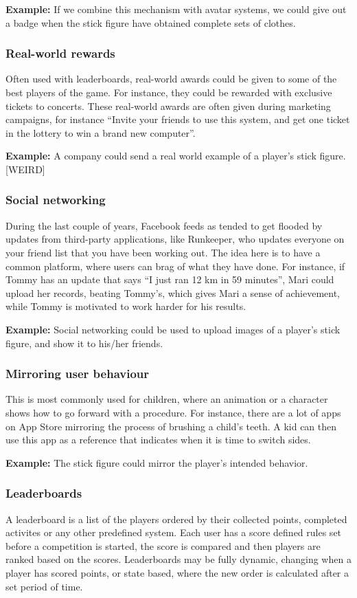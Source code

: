 \textbf{Example:} If we combine this mechanism with avatar systems, we could give out a badge when the stick figure have obtained complete sets of clothes.   

\subsubsection{Real-world rewards}
Often used with leaderboards, real-world awards could be given to some of the best players of the game. For instance, they could be rewarded with exclusive tickets to concerts. These real-world awards are often given during marketing campaigns, for instance ``Invite your friends to use this system, and get one ticket in the lottery to win a brand new computer''.  

\textbf{Example:} A company could send a real world example of a player's stick figure. [WEIRD]

\subsubsection{Social networking}
During the last couple of years, Facebook feeds as tended to get flooded by updates from third-party applications, like Runkeeper, who updates everyone on your friend list that you have been working out. The idea here is to have a common platform, where users can brag of what they have done. For instance, if Tommy has an update that says ``I just ran 12 km in 59 minutes'', Mari could upload her records, beating Tommy's, which gives Mari a sense of achievement, while Tommy is motivated to work harder for his results.     

\textbf{Example:} Social networking could be used to upload images of a player's stick figure, and show it to his/her friends. 

\subsubsection{Mirroring user behaviour}
This is most commonly used for children, where an animation or a character shows how to go forward with a procedure. For instance, there are a lot of apps on App Store mirroring the process of brushing a child's teeth. A kid can then use this app as a reference that indicates when it is time to switch sides.  

\textbf{Example:} The stick figure could mirror the player's intended behavior. 

\subsubsection{Leaderboards}
A leaderboard is a list of the players ordered by their collected points, completed activites or any other predefined system. Each user has a score defined rules set before a competition is started, the score is compared and then players are ranked based on the scores. Leaderboards may be fully dynamic, changing when a player has scored points, or state based, where the new order is calculated after a set period of time.

